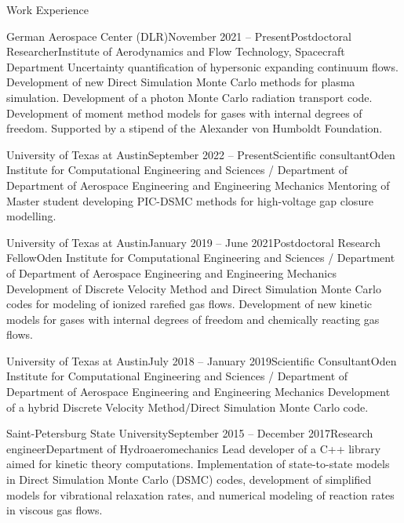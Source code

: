 \documentclass{resume} %
\begin{document}

\begin{rSection}{Work Experience}

\begin{rSubsection}{German Aerospace Center (DLR)}{November 2021 -- Present}{Postdoctoral Researcher}{Institute of Aerodynamics and Flow Technology, Spacecraft Department}
Uncertainty quantification of hypersonic expanding continuum flows. Development of new Direct Simulation Monte Carlo methods for plasma simulation. Development of a photon Monte Carlo radiation transport code. Development of moment method models for gases with internal degrees of freedom. Supported by a stipend of the Alexander von Humboldt Foundation.
\end{rSubsection}

\begin{rSubsection}{University of Texas at Austin}{September 2022 -- Present}{Scientific consultant}{Oden Institute for Computational Engineering and Sciences / Department of Department of Aerospace Engineering and Engineering Mechanics}
Mentoring of Master student developing PIC-DSMC methods for high-voltage gap closure modelling.
\end{rSubsection}

\begin{rSubsection}{University of Texas at Austin}{January 2019 -- June 2021}{Postdoctoral Research Fellow}{Oden Institute for Computational Engineering and Sciences / Department of Department of Aerospace Engineering and Engineering Mechanics}
Development of Discrete Velocity Method and Direct Simulation Monte Carlo codes for modeling of ionized rarefied gas flows. Development of new kinetic models for gases with internal degrees of freedom and chemically reacting gas flows.
\end{rSubsection}


\begin{rSubsection}{University of Texas at Austin}{July 2018 -- January 2019}{Scientific Consultant}{Oden Institute for Computational Engineering and Sciences  / Department of Department of Aerospace Engineering and Engineering Mechanics}
Development of a hybrid Discrete Velocity Method/Direct Simulation Monte Carlo code.
\end{rSubsection}

\begin{rSubsection}{Saint-Petersburg State University}{September 2015 -- December 2017}{Research engineer}{Department of Hydroaeromechanics}
Lead developer of a C++ library aimed for kinetic theory computations. Implementation of state-to-state models in Direct Simulation Monte Carlo (DSMC) codes, development of simplified models for vibrational relaxation rates, and numerical modeling of reaction rates in viscous gas flows.
\end{rSubsection}


\end{rSection}
\end{document}
